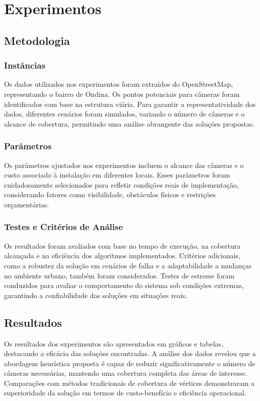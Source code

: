 \documentclass[12pt, a4paper]{report}
\begin{document}
\chapter{Experimentos}

\section{Metodologia}
\subsection{Instâncias}
Os dados utilizados nos experimentos foram extraídos do OpenStreetMap, representando o bairro de Ondina. Os pontos potenciais para câmeras foram identificados com base na estrutura viária. Para garantir a representatividade dos dados, diferentes cenários foram simulados, variando o número de câmeras e o alcance de cobertura, permitindo uma análise abrangente das soluções propostas.

\subsection{Parâmetros}
Os parâmetros ajustados nos experimentos incluem o alcance das câmeras e o custo associado à instalação em diferentes locais. Esses parâmetros foram cuidadosamente selecionados para refletir condições reais de implementação, considerando fatores como visibilidade, obstáculos físicos e restrições orçamentárias.

\subsection{Testes e Critérios de Análise}
Os resultados foram avaliados com base no tempo de execução, na cobertura alcançada e na eficiência dos algoritmos implementados. Critérios adicionais, como a robustez da solução em cenários de falha e a adaptabilidade a mudanças no ambiente urbano, também foram considerados. Testes de estresse foram conduzidos para avaliar o comportamento do sistema sob condições extremas, garantindo a confiabilidade das soluções em situações reais.

\section{Resultados}
Os resultados dos experimentos são apresentados em gráficos e tabelas, destacando a eficácia das soluções encontradas. A análise dos dados revelou que a abordagem heurística proposta é capaz de reduzir significativamente o número de câmeras necessárias, mantendo uma cobertura completa das áreas de interesse. Comparações com métodos tradicionais de cobertura de vértices demonstraram a superioridade da solução em termos de custo-benefício e eficiência operacional.
\end{document}
